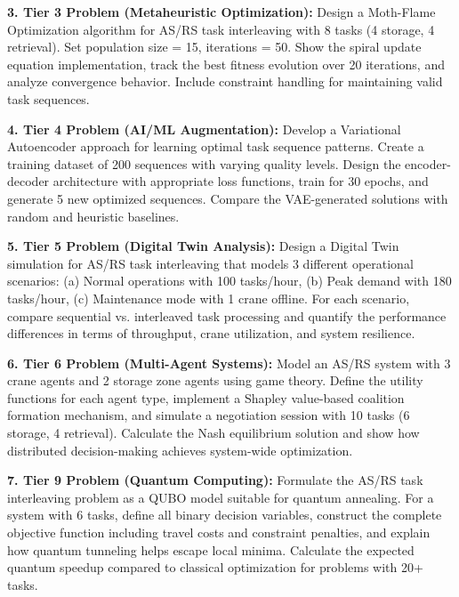 \documentclass{article}
\begin{document}
\textbf{3. Tier 3 Problem (Metaheuristic Optimization):}
Design a Moth-Flame Optimization algorithm for AS/RS task interleaving with 8 tasks (4 storage, 4 retrieval). Set population size = 15, iterations = 50. Show the spiral update equation implementation, track the best fitness evolution over 20 iterations, and analyze convergence behavior. Include constraint handling for maintaining valid task sequences.

\textbf{4. Tier 4 Problem (AI/ML Augmentation):}
Develop a Variational Autoencoder approach for learning optimal task sequence patterns. Create a training dataset of 200 sequences with varying quality levels. Design the encoder-decoder architecture with appropriate loss functions, train for 30 epochs, and generate 5 new optimized sequences. Compare the VAE-generated solutions with random and heuristic baselines.

\textbf{5. Tier 5 Problem (Digital Twin Analysis):}
Design a Digital Twin simulation for AS/RS task interleaving that models 3 different operational scenarios: (a) Normal operations with 100 tasks/hour, (b) Peak demand with 180 tasks/hour, (c) Maintenance mode with 1 crane offline. For each scenario, compare sequential vs. interleaved task processing and quantify the performance differences in terms of throughput, crane utilization, and system resilience.

\textbf{6. Tier 6 Problem (Multi-Agent Systems):}
Model an AS/RS system with 3 crane agents and 2 storage zone agents using game theory. Define the utility functions for each agent type, implement a Shapley value-based coalition formation mechanism, and simulate a negotiation session with 10 tasks (6 storage, 4 retrieval). Calculate the Nash equilibrium solution and show how distributed decision-making achieves system-wide optimization.

\textbf{7. Tier 9 Problem (Quantum Computing):}
Formulate the AS/RS task interleaving problem as a QUBO model suitable for quantum annealing. For a system with 6 tasks, define all binary decision variables, construct the complete objective function including travel costs and constraint penalties, and explain how quantum tunneling helps escape local minima. Calculate the expected quantum speedup compared to classical optimization for problems with 20+ tasks.
\end{document}
